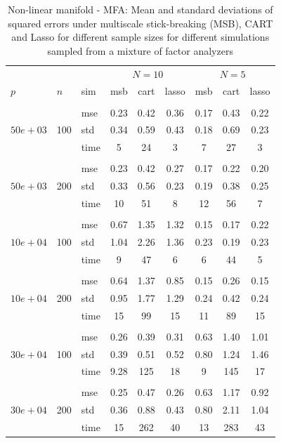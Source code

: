 \begin{table}[t]
\caption{Non-linear manifold - MFA: Mean and standard deviations of squared errors under multiscale stick-breaking (MSB), CART and Lasso for different sample sizes for different simulations sampled from a mixture of factor analyzers}\label{table:mfa}
\vskip 0.15in
\begin{center}
\begin{small}
\begin{sc}
\begin{tabular}{lllcccccc}
\hline
&&&\multicolumn{3}{c}{$N=10$}&\multicolumn{3}{c}{$N=5$}\\
$p$&$n$& sim& msb&cart&lasso & msb&cart&lasso\\
\\
\multirow{3}{*}{$50e+03$}&\multirow{3}{*}{100}&mse&0.23&0.42&0.36&0.17&0.43&0.22\\
&&std & 0.34 &0.59&0.43&0.18&0.69&0.23\\
&&time &5&24 & 3&7&27&3\\

\\
\multirow{3}{*}{$50e+03$}&\multirow{3}{*}{200}&mse&0.23 &0.42 &0.27&0.17&0.22&0.20\\
&&std & 0.33& 0.56&0.23&0.19&0.38&0.25\\
&&time & 10 &51&8&12&56&7\\

\\
\multirow{3}{*}{$10e+04$}&\multirow{3}{*}{100}&mse&0.67&1.35&1.32&0.15&0.17&0.22\\
&&std & 1.04&2.26&1.36&0.23&0.19&0.23\\
&&time &9&47&6&6&44&5\\

\\
\multirow{3}{*}{$10e+04$}&\multirow{3}{*}{200}&mse&0.64&1.37&0.85&0.15&0.26&0.15\\
&&std &0.95 &1.77&1.29&0.24&0.42&0.24\\
&&time &15&99&15&11&89&15\\
\\
\multirow{3}{*}{$30e+04$}&\multirow{3}{*}{100}&mse& 0.26&0.39&0.31&0.63&1.40&1.01\\
&&std &0.39&0.51&0.52&0.80 &1.24& 1.46 \\
&&time &9.28&125&18&9 &145& 17\\
\\
\multirow{3}{*}{$30e+04$}&\multirow{3}{*}{200}&mse&0.25&0.47&0.26&0.63&1.17&0.92\\
&&std &0.36&0.88&0.43 & 0.80&2.11&1.04 \\
&&time &15&262&40&13&283&43\\



\end{tabular}
\end{sc}
\end{small}
\end{center}
\end{table}

